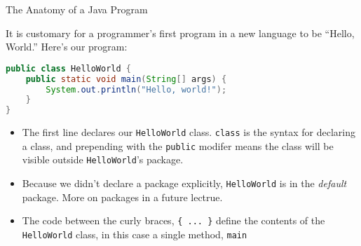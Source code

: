 \documentclass{beamer}
\begin{document}
\begin{frame}
  \titlepage
\end{frame}

\begin{frame}[fragile]{The Anatomy of a Java Program}


It is customary for a programmer's first program in a new language to be ``Hello, World.''  Here's our  program:
\begin{lstlisting}[language=Java]
public class HelloWorld {
    public static void main(String[] args) {
        System.out.println("Hello, world!");
    }
}
\end{lstlisting}
\vspace{-.1in}
\begin{itemize}
\item The first line declares our {\tt HelloWorld} class.  {\tt class} is the syntax for declaring a class, and prepending with the {\tt public} modifer means the class will be visible outside {\tt HelloWorld}'s package.
\item Because we didn't declare a package explicitly, {\tt HelloWorld} is in the {\it default} package.  More on packages in a future lectrue.
\item The code between the curly braces, {\tt \{ ... \}} define the contents of the {\tt HelloWorld} class, in this case a single method, {\tt main}
\end{itemize}

\end{frame}
\end{document}
